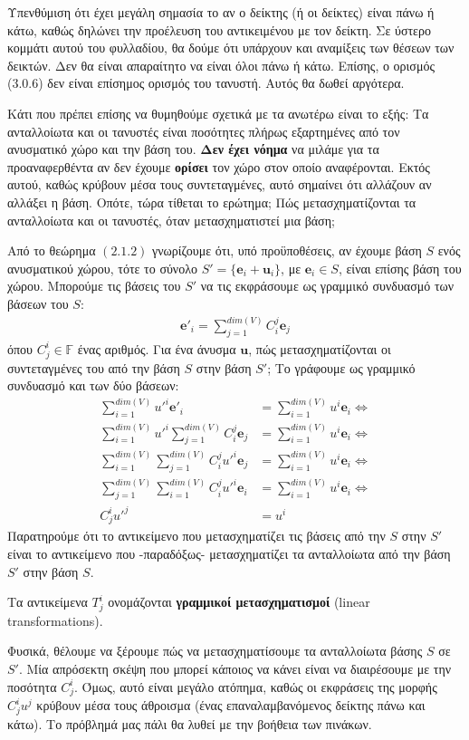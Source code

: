 \documentclass[main.tex]{subfiles}
\begin{document}
	Υπενθύμιση ότι έχει μεγάλη σημασία το αν ο δείκτης (ή οι δείκτες) είναι πάνω ή κάτω, καθώς δηλώνει την προέλευση του αντικειμένου με τον δείκτη. Σε ύστερο κομμάτι αυτού του φυλλαδίου, θα δούμε ότι υπάρχουν και αναμίξεις των θέσεων των δεικτών. Δεν θα είναι απαραίτητο να είναι όλοι πάνω ή κάτω. Επίσης, ο ορισμός (3.0.6) δεν είναι επίσημος ορισμός του τανυστή. Αυτός θα δωθεί αργότερα.

	Κάτι που πρέπει επίσης να θυμηθούμε σχετικά με τα ανωτέρω είναι το εξής:
	Τα ανταλλοίωτα και οι τανυστές είναι ποσότητες πλήρως εξαρτημένες από τον ανυσματικό χώρο και την βάση του. \textbf{Δεν έχει νόημα} να μιλάμε για τα προαναφερθέντα αν δεν έχουμε \textbf{ορίσει} τον χώρο στον οποίο αναφέρονται. Εκτός αυτού, καθώς κρύβουν μέσα τους συντεταγμένες, αυτό σημαίνει ότι αλλάζουν αν αλλάξει η βάση. Οπότε, τώρα τίθεται το ερώτημα; Πώς μετασχηματίζονται τα ανταλλοίωτα και οι τανυστές, όταν μετασχηματιστεί μια βάση;
	
	Από το θεώρημα $(2.1.2)$ γνωρίζουμε ότι, υπό προϋποθέσεις, αν έχουμε βάση $S$ ενός ανυσματικού χώρου, τότε το σύνολο ${S' = \{\boldsymbol{e}_i + \boldsymbol{u}_i\}}$, με ${\boldsymbol{e}_i \in S}$, είναι επίσης βάση του χώρου. Μπορούμε τις βάσεις του $S'$ να τις εκφράσουμε ως γραμμικό συνδυασμό των βάσεων του $S$:
	\begin{align*}
		\boldsymbol{e}'_i = \sum^{dim(V)}_{j=1}C^j_i\boldsymbol{e}_j
	\end{align*}
	όπου $C^i_j \in \mathbb{F}$ ένας αριθμός. Για ένα άνυσμα $\boldsymbol{u}$, πώς μετασχηματίζονται οι συντεταγμένες του από την βάση $S$ στην βάση $S'$; Το γράφουμε ως γραμμικό συνδυασμό και των δύο βάσεων:
	\begin{align*}
		\sum_{i=1}^{dim(V)}u'^i\boldsymbol{e}'_i &= \sum_{i=1}^{dim(V)}u^i\boldsymbol{e}_i \Leftrightarrow \\
		\sum_{i=1}^{dim(V)}u'^i\sum^{dim(V)}_{j=1}C^j_i\boldsymbol{e}_j &= \sum_{i=1}^{dim(V)}u^i\boldsymbol{e}_i \Leftrightarrow \\
		\sum_{i=1}^{dim(V)}\sum^{dim(V)}_{j=1}C^j_iu'^i\boldsymbol{e}_j &= \sum_{i=1}^{dim(V)}u^i\boldsymbol{e}_i \Leftrightarrow \\
		\sum_{j=1}^{dim(V)}\sum^{dim(V)}_{i=1}C^j_iu'^i\boldsymbol{e}_i &= \sum_{i=1}^{dim(V)}u^i\boldsymbol{e}_i \Leftrightarrow \\
		C^i_ju'^j &= u^i
	\end{align*}
	Παρατηρούμε ότι το αντικείμενο που μετασχηματίζει τις βάσεις από την $S$ στην $S'$ είναι το αντικείμενο που -παραδόξως- μετασχηματίζει τα ανταλλοίωτα από την βάση $S'$ στην βάση $S$. 
	\begin{definition}
		Τα αντικείμενα $T^i_j$ ονομάζονται \textbf{γραμμικοί μετασχηματισμοί} (linear transformations).
	\end{definition}
	Φυσικά, θέλουμε να ξέρουμε πώς να μετασχηματίσουμε τα ανταλλοίωτα βάσης $S$ σε $S'$. Μία απρόσεκτη σκέψη που μπορεί κάποιος να κάνει είναι να διαιρέσουμε με την ποσότητα $C^i_j$. Όμως, αυτό είναι μεγάλο ατόπημα, καθώς οι εκφράσεις της μορφής $C^i_ju^j$ κρύβουν μέσα τους άθροισμα (ένας επαναλαμβανόμενος δείκτης πάνω και κάτω).
	Το πρόβλημά μας πάλι θα λυθεί με την βοήθεια των πινάκων.
	
\end{document}
